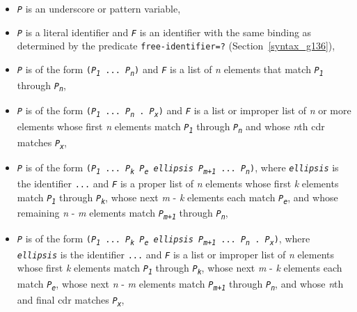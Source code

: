 \begin{itemize}
\item 
\texttt{\textit{P}} is an underscore or pattern variable,

\item 
\texttt{\textit{P}} is a literal identifier
and \texttt{\textit{F}} is an identifier with
the same binding as determined by the predicate
\texttt{free-identifier=?}
(Section \ref{syntax_g136}),

\item 
\texttt{\textit{P}} is of the form
\texttt{(\textit{P\textsubscript{1}} ... \textit{P\textsubscript{n}})}
and \texttt{\textit{F}} is a list of \textit{n} elements that match \texttt{\textit{P\textsubscript{1}}} through
\texttt{\textit{P\textsubscript{n}}},

\item 
\texttt{\textit{P}} is of the form
\texttt{(\textit{P\textsubscript{1}} ... \textit{P\textsubscript{n}} . \textit{P\textsubscript{x}})}
and \texttt{\textit{F}} is a list or improper list of \textit{n} or more elements
whose first \textit{n} elements match \texttt{\textit{P\textsubscript{1}}} through \texttt{\textit{P\textsubscript{n}}}
and
whose \textit{n}th cdr matches \texttt{\textit{P\textsubscript{x}}},

\item 
\texttt{\textit{P}} is of the form
\texttt{(\textit{P\textsubscript{1}} ... \textit{P\textsubscript{k}} \textit{P\textsubscript{e}} \textit{ellipsis} \textit{P\textsubscript{\textit{m}+1}} ... \textit{P\textsubscript{n}})},
where \texttt{\textit{ellipsis}} is the identifier \texttt{...}
and \texttt{\textit{F}} is a proper list of \textit{n}
elements whose first \textit{k} elements match \texttt{\textit{P\textsubscript{1}}} through \texttt{\textit{P\textsubscript{k}}},
whose next \textit{m} - \textit{k} elements each match \texttt{\textit{P\textsubscript{e}}},
and
whose remaining \textit{n} - \textit{m} elements match \texttt{\textit{P\textsubscript{\textit{m}+1}}} through \texttt{\textit{P\textsubscript{n}}},

\item 
\texttt{\textit{P}} is of the form
\texttt{(\textit{P\textsubscript{1}} ... \textit{P\textsubscript{k}} \textit{P\textsubscript{e}} \textit{ellipsis} \textit{P\textsubscript{\textit{m}+1}} ... \textit{P\textsubscript{n}} . \textit{P\textsubscript{x}})},
where \texttt{\textit{ellipsis}} is the identifier \texttt{...}
and \texttt{\textit{F}} is a list or improper list of \textit{n}
elements whose first \textit{k} elements match \texttt{\textit{P\textsubscript{1}}} through \texttt{\textit{P\textsubscript{k}}},
whose next \textit{m} - \textit{k} elements each match \texttt{\textit{P\textsubscript{e}}},
whose next \textit{n} - \textit{m} elements match \texttt{\textit{P\textsubscript{\textit{m}+1}}} through \texttt{\textit{P\textsubscript{n}}},
and 
whose \textit{n}th and final cdr matches \texttt{\textit{P\textsubscript{x}}},


\end{itemize}
